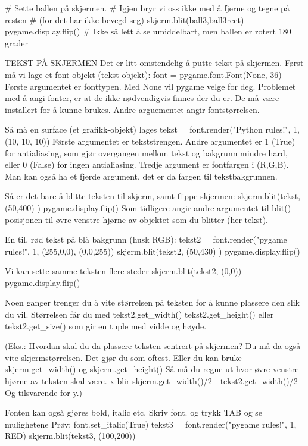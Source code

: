 # Sette ballen på skjermen.
# Igjen bryr vi oss ikke med å fjerne og tegne på resten
# (for det har ikke bevegd seg)
skjerm.blit(ball3,ball3rect)
pygame.display.flip()
# Ikke så lett å se umiddelbart, men ballen er rotert 180 grader



TEKST PÅ SKJERMEN
Det er litt omstendelig å putte tekst på skjermen.
Først må vi lage et font-objekt (tekst-objekt):
font = pygame.font.Font(None, 36)
Første argumentet er fonttypen. Med None vil pygame velge for deg.
Problemet med å angi fonter, er at de ikke nødvendigvis finnes
der du er. De må være installert for å kunne brukes.
Andre arguementet angir fontstørrelsen.

Så må en surface (et grafikk-objekt) lages 
tekst = font.render("Python rules!", 1, (10, 10, 10))
Første argumentet er tekststrengen.
Andre argumentet er 1 (True) for antialiasing, som gjør overgangen
mellom tekst og bakgrunn mindre hard, eller 0 (False) for ingen antialiasing.
Tredje argument er fontfargen i (R,G,B).
Man kan også ha et fjerde argument, det er da fargen til tekstbakgrunnen.

Så er det bare å blitte teksten til skjerm, samt flippe skjermen:
skjerm.blit(tekst, (50,400) ) 
pygame.display.flip()
Som tidligere angir andre argumentet til blit() posisjonen til
øvre-venstre hjørne av objektet som du blitter (her tekst). 


En til, rød tekst på blå bakgrunn (husk RGB): 
tekst2 = font.render("pygame rules!", 1, (255,0,0), (0,0,255))
skjerm.blit(tekst2, (50,430) ) 
pygame.display.flip()

Vi kan sette samme teksten flere steder
skjerm.blit(tekst2, (0,0))
pygame.display.flip()

Noen ganger trenger du å vite størrelsen på teksten for å kunne plassere
den slik du vil.
Størrelsen får du med
tekst2.get_width()
tekst2.get_height()
eller
tekst2.get_size()
som gir en tuple med vidde og høyde. 

(Eks.: Hvordan skal du da plassere teksten sentrert på skjermen?
Du må da også vite skjermstørrelsen. Det gjør du som oftest.
Eller du kan bruke skjerm.get_width() og skjerm.get_height()
Så må du regne ut hvor øvre-venstre hjørne av teksten skal være.
x blir  skjerm.get_width()/2 - tekst2.get_width()/2
Og tilsvarende for y.) 


Fonten kan også gjøres bold, italic etc.
Skriv font. og trykk TAB og se mulighetene
Prøv:
font.set_italic(True)
tekst3 = font.render("pygame rules!", 1, RED)
skjerm.blit(tekst3, (100,200))


